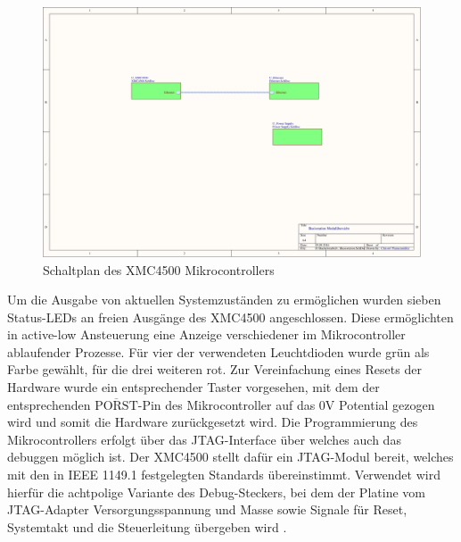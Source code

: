 \begin{figure}[h]
	\centering
	\includegraphics[width=\linewidth,page=5]{"../../Altium/mobile Basisstation/Project Outputs for mobile Basisstation/Basisstation Schematics"}
	\caption{Schaltplan des XMC4500 Mikrocontrollers}
	\label{fig:schemXMC}
\end{figure}



Um die Ausgabe von aktuellen Systemzuständen zu ermöglichen wurden sieben Status-LEDs an freien Ausgänge des XMC4500  angeschlossen. Diese ermöglichten in active-low Ansteuerung eine Anzeige verschiedener im Mikrocontroller ablaufender Prozesse. Für vier der verwendeten Leuchtdioden wurde grün als Farbe gewählt, für die drei weiteren rot. Zur Vereinfachung eines Resets der Hardware wurde ein entsprechender Taster vorgesehen, mit dem der entsprechenden  $\overline{\text{PORST}}$-Pin des Mikrocontroller auf das 0V Potential gezogen wird und somit die Hardware zurückgesetzt wird.
Die Programmierung des Mikrocontrollers erfolgt über das \ac{JTAG}-Interface über welches auch das debuggen möglich ist. Der XMC4500 stellt dafür ein \ac{JTAG}-Modul bereit, welches mit den in IEEE 1149.1 festgelegten Standards übereinstimmt. Verwendet wird hierfür die achtpolige Variante des Debug-Steckers, bei dem der Platine vom \ac{JTAG}-Adapter Versorgungsspannung und Masse sowie Signale für Reset, Systemtakt und die Steuerleitung übergeben wird \cite{XMC-DataSheet}.  %


